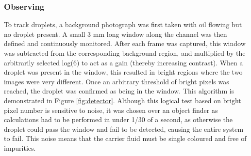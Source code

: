 \documentclass{physics_article_B}
\begin{document}
        \subsubsection{Observing}
        To track droplets, a background photograph was first taken with oil flowing but no droplet present. A small 3 mm long window along the channel was then defined and continuously monitored. After each frame was captured, this window was subtracted from the corresponding background region, and multiplied by the arbitrarily selected log(6) to act as a gain (thereby increasing contrast). When a droplet was present in the window, this resulted in bright regions where the two images were very different. Once an arbitrary threshold of bright pixels was reached, the droplet was confirmed as being in the window. This algorithm is demonstrated in Figure \ref{fig:detector}. Although this logical test based on bright pixel number is sensitive to noise, it was chosen over an object finder as calculations had to be performed in under 1/30 of a second, as otherwise the droplet could pass the window and fail to be detected, causing the entire system to fail. This noise means that the carrier fluid must be single coloured and free of impurities. \\
        
\end{document}

